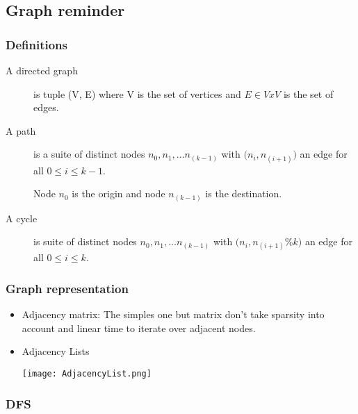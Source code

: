 
\subsection{Graph reminder}

\subsubsection{Definitions}

\begin{description}
    \item[A directed graph] is tuple (V, E) where V is the set of vertices 
        and $E \in V x V$ is the set of edges.

    \item[A path] is a suite of distinct nodes $n_0, n_1, ... n_{(k-1)}$ with
        $\big(n_i, n_{(i+1)}\big)$ an
        edge for all $0 \leq i \le k-1$. 

    Node $n_0$ is the origin and node $n_{(k-1)}$ is the
        destination.

    \item[A cycle] is suite of distinct nodes  $n_0, n_1, ... n_{(k-1)}$ with
        $\big(n_i, n_{(i+1)}\% k\big)$ an edge for all $0 \leq i \le k$.
\end{description}

\subsubsection{Graph representation}

\begin{itemize}
    \item Adjacency matrix: The simples one but matrix don't take
        sparsity into account and linear time to iterate over adjacent
        nodes.

    \item Adjacency Lists

        \begin{center}
            \texttt{[image: AdjacencyList.png]}
        \end{center}
\end{itemize}


\subsubsection{DFS}

